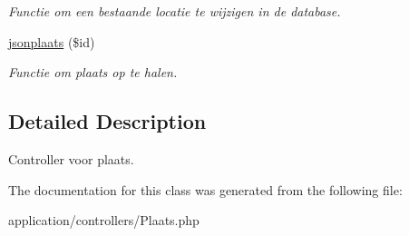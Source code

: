 \begin{DoxyCompactItemize}
\begin{DoxyCompactList}\small\item\em Functie om een bestaande locatie te wijzigen in de database. \end{DoxyCompactList}\item 
\mbox{\label{class_plaats_a7071ac3422060575601bab2b2065cf31}} 
\mbox{\hyperlink{class_plaats_a7071ac3422060575601bab2b2065cf31}{jsonplaats}} (\$id)
\begin{DoxyCompactList}\small\item\em Functie om plaats op te halen. \end{DoxyCompactList}\end{DoxyCompactItemize}


\subsection{Detailed Description}
Controller voor plaats. 

The documentation for this class was generated from the following file\+:\begin{DoxyCompactItemize}
\item 
application/controllers/Plaats.\+php\end{DoxyCompactItemize}

